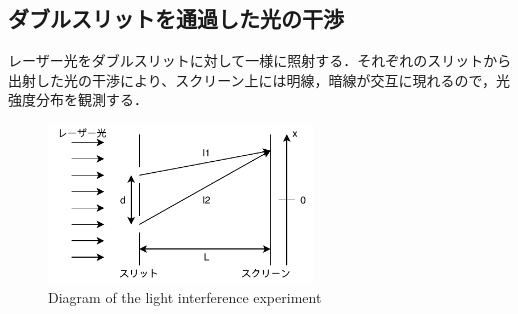 \subsection{ダブルスリットを通過した光の干渉}
レーザー光をダブルスリットに対して一様に照射する．それぞれのスリットから出射した光の干渉により、スクリーン上には明線，暗線が交互に現れるので，光強度分布を観測する．
\begin{figure}[H]
    \centering
    \includegraphics[width=7cm]{./fig/fig2.pdf}
    \caption{Diagram of the light interference experiment}
    \label{fig:diagram_of_the_light_interference_experiment}
\end{figure}





